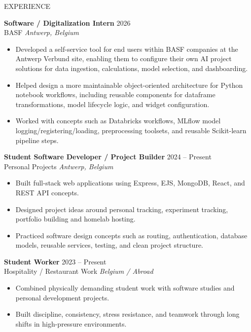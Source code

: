 \documentclass{resume}
\begin{document}

\begin{rSection}{EXPERIENCE}

\textbf{Software / Digitalization Intern} \hfill 2026\\
BASF \hfill \textit{Antwerp, Belgium}
 \begin{itemize}
    \itemsep -3pt {}
    \item Developed a self-service tool for end users within BASF companies at the Antwerp Verbund site, enabling them
to configure their own AI project solutions for data ingestion, calculations, model selection, and dashboarding.
    \item Helped design a more maintainable object-oriented architecture for Python notebook workflows, including
reusable components for dataframe transformations, model lifecycle logic, and widget configuration.
    \item Worked with concepts such as Databricks workflows, MLflow model logging/registering/loading, preprocessing
toolsets, and reusable Scikit-learn pipeline steps.
 \end{itemize}

\textbf{Student Software Developer / Project Builder} \hfill 2024 -- Present\\
Personal Projects \hfill \textit{Antwerp, Belgium}
 \begin{itemize}
    \itemsep -3pt {}
    \item Built full-stack web applications using Express, EJS, MongoDB, React, and REST API concepts.
    \item Designed project ideas around personal tracking, experiment tracking, portfolio building and homelab hosting.
    \item Practiced software design concepts such as routing, authentication, database models, reusable services, testing, and clean project structure.
 \end{itemize}

\textbf{Student Worker} \hfill 2023 -- Present\\
Hospitality / Restaurant Work \hfill \textit{Belgium / Abroad}
 \begin{itemize}
    \itemsep -3pt {}
    \item Combined physically demanding student work with software studies and personal development projects.
    \item Built discipline, consistency, stress resistance, and teamwork through long shifts in high-pressure environments.
 \end{itemize}

\end{rSection} 
\end{document}
